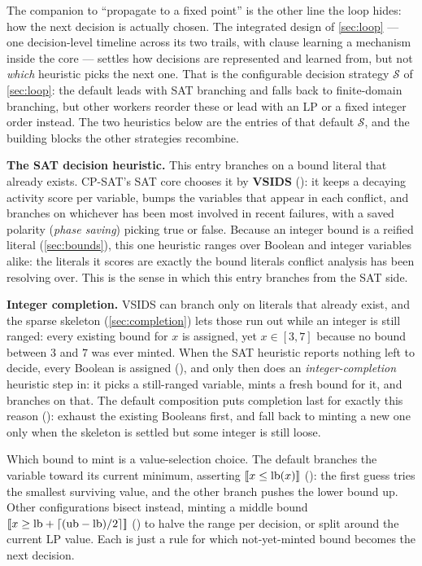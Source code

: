 The companion to ``propagate to a fixed point'' is the other line the loop hides:
how the next decision is actually chosen. The integrated design of
\cref{sec:loop} --- one decision-level timeline across its two trails, with clause learning a mechanism
inside the core --- settles how decisions are represented and learned from, but
not \emph{which} heuristic picks the next one. That is the configurable decision
strategy $\mathcal{S}$ of \cref{sec:loop}: the default leads with SAT
branching and falls back to finite-domain branching, but other workers reorder
these or lead with an LP or a fixed integer order instead. The two heuristics
below are the entries of that default $\mathcal{S}$, and the building blocks the
other strategies recombine.

\textbf{The SAT decision heuristic.} This entry branches on a bound literal that
already exists. CP-SAT's SAT core chooses it by \textbf{VSIDS}
(): it keeps a decaying activity score per variable,
bumps the variables that appear in each conflict, and branches on whichever has
been most involved in recent failures, with a saved polarity (\emph{phase
saving}) picking true or false. Because an integer bound is a reified literal
(\cref{sec:bounds}), this one heuristic ranges over Boolean and integer
variables alike: the literals it scores are exactly the bound literals conflict
analysis has been resolving over. This is the sense in which this entry branches
from the SAT side.

\textbf{Integer completion.} VSIDS can branch only on literals that already
exist, and the sparse skeleton (\cref{sec:completion}) lets those run out
while an integer is still ranged: every existing bound for $x$ is assigned,
yet $x \in [3,7]$ because no bound between $3$ and $7$ was ever minted. When
the SAT heuristic reports nothing left to decide, every Boolean is assigned
(), and only then does an
\emph{integer-completion} heuristic step in: it picks a still-ranged variable,
mints a fresh bound for it, and branches on that. The default composition puts
completion last for exactly this reason ():
exhaust the existing Booleans first, and fall back to minting a new one only when
the skeleton is settled but some integer is still loose.

Which bound to mint is a value-selection choice. The default branches the
variable toward its current minimum, asserting $[\![x \le \text{lb}(x)]\!]$ (): the first guess tries
the smallest surviving value, and the other branch pushes the lower bound up.
Other configurations bisect instead, minting a middle bound
$[\![x \ge \text{lb} + \lceil(\text{ub}-\text{lb})/2\rceil]\!]$
() to halve the range
per decision, or split around the current LP value. Each is just a rule for which
not-yet-minted bound becomes the next decision.

